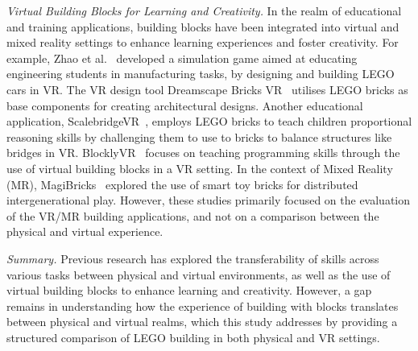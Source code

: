 \textit{Virtual Building Blocks for Learning and Creativity.}
In the realm of educational and training applications, building blocks have been integrated into virtual and mixed reality settings to enhance learning experiences and foster creativity.
For example, Zhao et al.~\cite{Zhao2019} developed a simulation game aimed at educating engineering students in manufacturing tasks, by designing and building LEGO cars in VR. 
The VR design tool Dreamscape Bricks VR~\cite{Doma2022dreamscape} utilises LEGO bricks as base components for creating architectural designs.
Another educational application, ScalebridgeVR~\cite{Pietroszek2019}, employs LEGO bricks to teach children proportional reasoning skills by challenging them to use to bricks to balance structures like bridges in VR.
BlocklyVR~\cite{Hedlund2023} focuses on teaching programming skills through the use of virtual building blocks in a VR setting.
In the context of Mixed Reality (MR), MagiBricks~\cite{Stefanidi2023} explored the use of smart toy bricks for distributed intergenerational play.
However, these studies primarily focused on the evaluation of the VR/MR building applications, and not on a comparison between the physical and virtual experience.

\textit{Summary.} Previous research has explored the transferability of skills across various tasks between physical and virtual environments, as well as the use of virtual building blocks to enhance learning and creativity. 
However, a gap remains in understanding how the experience of building with blocks translates between physical and virtual realms, which this study addresses by providing a structured comparison of LEGO building in both physical and VR settings.